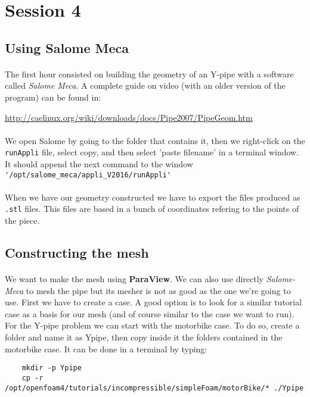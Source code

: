 \lstset{language=C}
\section{Session 4}


\subsection{Using Salome Meca}
\paragraph{}The first hour consisted on building the geometry of an \textsf{Y-pipe} with a software called \emph{Salome Meca}. A complete guide on video (with an older version of the program) can be found in:\\
\begin{center}
\url{http://caelinux.org/wiki/downloads/docs/Pipe2007/PipeGeom.htm}
\end{center}

\paragraph{}We open Salome by going to the folder that contains it, then we right-click on the \texttt{runAppli} file, select copy, and then select 'paste filename' in a terminal window. It should append the next command to the window\\
\lstinline!'/opt/salome_meca/appli_V2016/runAppli'!
\paragraph{}When we have our geometry constructed we have to export the files produced as \texttt{.stl} files. This files are based in a bunch of coordinates refering to the points of the piece. 
\subsection{Constructing the mesh}
\paragraph{}We want to make the mesh using \textbf{ParaView}. We can also use directly \emph{Salome-Meca} to mesh the pipe but its mesher is not as good as the one we're going to use. First we have to create a case. A good option is to look for a similar tutorial case as a basis for our mesh (and of course similar to the case we want to run). For the Y-pipe problem we can start with the motorbike case. To do so, create a folder and name it as Ypipe, then copy inside it the folders contained in the motorbike case. It can be done in a terminal by typing:
\begin{scriptsize}
\begin{lstlisting}
	mkdir -p Ypipe
	cp -r /opt/openfoam4/tutorials/incompressible/simpleFoam/motorBike/* ./Ypipe
\end{lstlisting}
\end{scriptsize}

